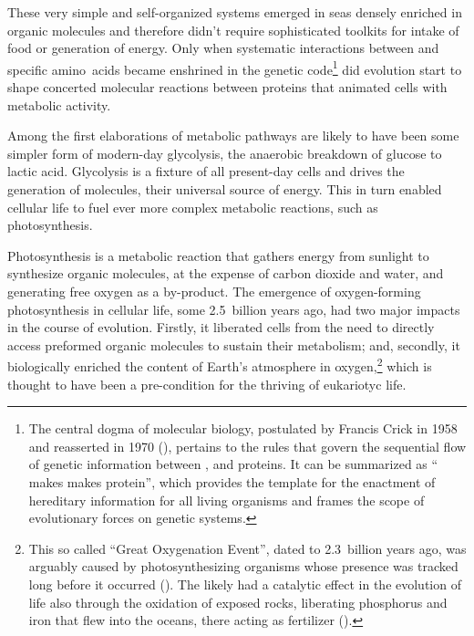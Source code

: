 These very simple and \mbox{self-organized} systems emerged in seas densely
enriched in organic molecules and therefore didn't require sophisticated
toolkits for intake of food or generation of energy.  Only when systematic
interactions between  and specific amino~acids became enshrined
in the genetic code\footnote{The central dogma of molecular biology, postulated
  by Francis Crick in 1958 and reasserted in 1970
  (\citealp{crick_protein_1958,crick_central_1970}), pertains to the rules that
  govern the sequential flow of genetic information between ,
   and proteins. It can be summarized as `` makes
   makes protein'', which provides the template for the enactment
  of hereditary information for all living organisms and frames the scope of
  evolutionary forces on genetic systems.} did evolution start to shape
concerted molecular reactions between proteins that animated cells with
metabolic activity.

Among the first elaborations of metabolic pathways are likely to have been some
simpler form of \mbox{modern-day} glycolysis, the anaerobic breakdown of glucose
to lactic acid.  Glycolysis is a fixture of all \mbox{present-day} cells and
drives the generation of  molecules, their universal source of
energy.  This in turn enabled cellular life to fuel ever more complex metabolic
reactions, such as photosynthesis.

Photosynthesis is a metabolic reaction that gathers energy from sunlight to
synthesize organic molecules, at the expense of carbon dioxide and water, and
generating free oxygen as a \mbox{by-product}.  The emergence of
\mbox{oxygen-forming} photosynthesis in cellular life, some 2.5~billion years
ago, had two major impacts in the course of evolution.  Firstly, it liberated
cells from the need to directly access preformed organic molecules to sustain
their metabolism; and, secondly, it biologically enriched the content of Earth's
atmosphere in oxygen,\footnote{This so called ``Great Oxygenation Event'', dated
  to 2.3~billion years ago, was arguably caused by photosynthesizing organisms
  whose presence was tracked long before it occurred
  (\citealp{flannery_archean_2012}). The  likely had a catalytic
  effect in the evolution of life also through the oxidation of exposed rocks,
  liberating phosphorus and iron that flew into the oceans, there acting as
  fertilizer (\citealp{zimmer_mystery_2013}).} which is thought to have been a
\mbox{pre-condition} for the thriving of eukariotyc life.

